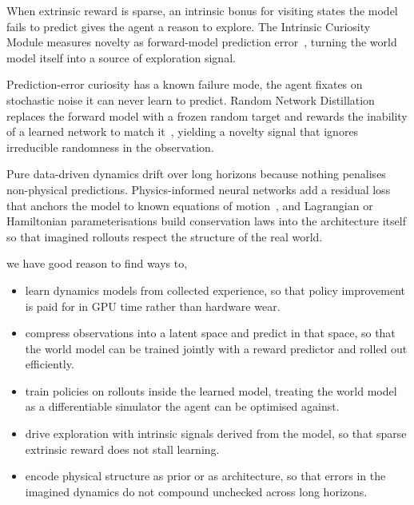 When extrinsic reward is sparse, an intrinsic bonus for visiting states the model fails to predict
gives the agent a reason to explore.
The Intrinsic Curiosity Module measures novelty as forward-model prediction error~\cite{Pathak2017Curiosity},
turning the world model itself into a source of exploration signal.


Prediction-error curiosity has a known failure mode,
the agent fixates on stochastic noise it can never learn to predict.
Random Network Distillation replaces the forward model with a frozen random target
and rewards the inability of a learned network to match it~\cite{Burda2019RND},
yielding a novelty signal that ignores irreducible randomness in the observation.

Pure data-driven dynamics drift over long horizons because nothing penalises non-physical predictions.
Physics-informed neural networks add a residual loss that anchors the model to known equations of motion~\cite{Raissi2019PINN},
and Lagrangian or Hamiltonian parameterisations build conservation laws into the architecture itself
so that imagined rollouts respect the structure of the real world.

we have good reason to find ways to,
\begin{itemize}
    \item learn dynamics models from collected experience,
    so that policy improvement is paid for in GPU time rather than hardware wear.
    \item compress observations into a latent space and predict in that space,
    so that the world model can be trained jointly with a reward predictor and rolled out efficiently.
    \item train policies on rollouts inside the learned model,
    treating the world model as a differentiable simulator the agent can be optimised against.
    \item drive exploration with intrinsic signals derived from the model,
    so that sparse extrinsic reward does not stall learning.
    \item encode physical structure as prior or as architecture,
    so that errors in the imagined dynamics do not compound unchecked across long horizons.
\end{itemize}

